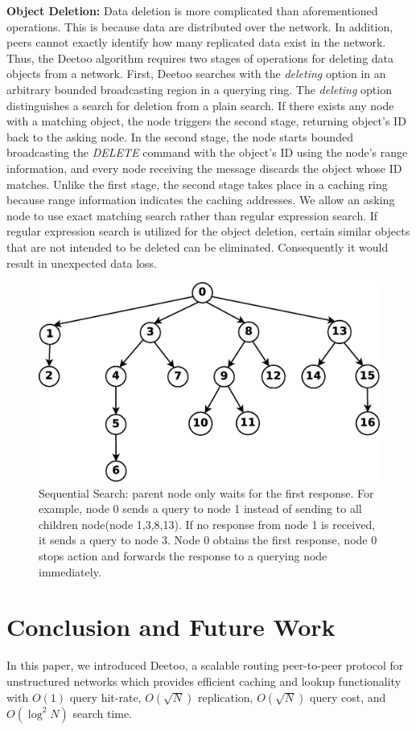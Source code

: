 \documentclass[conference]{IEEEtran}
\begin{document}
\textbf{Object Deletion:} Data deletion is more complicated than aforementioned operations.
This is because data are distributed over the network. In addition, peers cannot exactly identify 
how many replicated data exist in the network.
Thus, the Deetoo algorithm requires two stages of operations for deleting data objects from a network. 
First, Deetoo searches with the \textit{deleting} option 
in an arbitrary bounded broadcasting region in a querying ring. The \textit{deleting} 
option distinguishes a search for deletion from a plain search.
If there exists any node with a matching object, the node triggers the second stage, returning 
object's ID back to the asking node. 
In the second stage, the node starts bounded broadcasting the \textit{DELETE} command with the object's ID using 
the node's range information, and every node receiving the message discards the object whose ID matches.
Unlike the first stage, the second stage takes place in a caching ring because range 
information indicates the caching addresses.
We allow an asking node to use exact matching search rather than regular expression search. 
If regular expression search is utilized for the object deletion, 
certain similar objects that are not intended to be deleted can be eliminated. 
Consequently it would result in unexpected data loss.

\begin{figure}
\centering
\includegraphics[width=3 in]{regextree}
\caption{Sequential Search: parent node only waits for the first response. For example, 
node 0 sends a query to node 1 instead of sending to all children node(node 1,3,8,13). 
If no response from node 1 is received, it sends a query to node 3. Node 0 obtains the first 
response, node 0 stops action and forwards the response to a querying node immediately.} 
\label{fig:regextree}
\end{figure}
\fi

\section{Conclusion and Future Work}
\label{sec:conclusion}
In this paper, we introduced Deetoo, a scalable routing peer-to-peer
protocol for unstructured networks which provides efficient caching
and lookup functionality with $O(1)$ query hit-rate, $O(\sqrt N)$
replication, $O(\sqrt{N})$ query cost, and $O(\log^2 N)$ search time.
\end{document}

